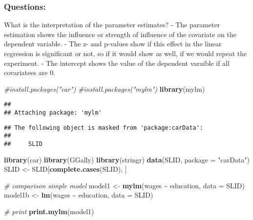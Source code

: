 \documentclass[
]{article}
\newenvironment{Shaded}{\begin{snugshade}}{\end{snugshade}}
\newcommand{\AttributeTok}[1]{\textcolor[rgb]{0.13,0.29,0.53}{#1}}
\newcommand{\CommentTok}[1]{\textcolor[rgb]{0.56,0.35,0.01}{\textit{#1}}}
\newcommand{\FunctionTok}[1]{\textcolor[rgb]{0.13,0.29,0.53}{\textbf{#1}}}
\newcommand{\NormalTok}[1]{#1}
\newcommand{\OtherTok}[1]{\textcolor[rgb]{0.56,0.35,0.01}{#1}}
\newcommand{\SpecialCharTok}[1]{\textcolor[rgb]{0.81,0.36,0.00}{\textbf{#1}}}
\newcommand{\StringTok}[1]{\textcolor[rgb]{0.31,0.60,0.02}{#1}}
\begin{document}
\hypertarget{questions}{%
\subsubsection{Questions:}\label{questions}}

What is the interpretation of the parameter estimates? - The parameter
estimation shows the influence or strength of influence of the covariate
on the dependent variable. - The z- and p-values show if this effect in
the linear regression is significant or not, so if it would show as
well, if we would repeat the experiment. - The intercept shows the value
of the dependent varaible if all covariatees are 0.

\begin{Shaded}
\begin{Highlighting}[]
\CommentTok{\#install.packages("car")}
\CommentTok{\#install.packages("mylm")}
\FunctionTok{library}\NormalTok{(mylm)}
\end{Highlighting}
\end{Shaded}

\begin{verbatim}
## 
## Attaching package: 'mylm'
\end{verbatim}

\begin{verbatim}
## The following object is masked from 'package:carData':
## 
##     SLID
\end{verbatim}

\begin{Shaded}
\begin{Highlighting}[]
\FunctionTok{library}\NormalTok{(car)}
\FunctionTok{library}\NormalTok{(GGally)}
\FunctionTok{library}\NormalTok{(stringr)}
\FunctionTok{data}\NormalTok{(SLID, }\AttributeTok{package =} \StringTok{"carData"}\NormalTok{)}
\NormalTok{SLID }\OtherTok{\textless{}{-}}\NormalTok{ SLID[}\FunctionTok{complete.cases}\NormalTok{(SLID), ]}

\CommentTok{\# comparison simple model}
\NormalTok{model1 }\OtherTok{\textless{}{-}} \FunctionTok{mylm}\NormalTok{(wages }\SpecialCharTok{\textasciitilde{}}\NormalTok{ education, }\AttributeTok{data =}\NormalTok{ SLID)}
\NormalTok{model1b }\OtherTok{\textless{}{-}} \FunctionTok{lm}\NormalTok{(wages }\SpecialCharTok{\textasciitilde{}}\NormalTok{ education, }\AttributeTok{data =}\NormalTok{ SLID)}

\CommentTok{\# print}
\FunctionTok{print.mylm}\NormalTok{(model1)}
\end{Highlighting}
\end{Shaded}
\end{document}
